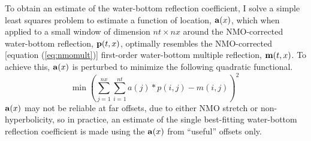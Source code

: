 \par
To obtain an estimate of the water-bottom reflection coefficient, I solve a simple least squares
problem to estimate a function of location, $\bold a(x)$, which when applied to a small window of 
dimension $nt \times nx$
around the NMO-corrected water-bottom reflection, $\bold p(t,x)$, optimally resembles the NMO-corrected 
[equation (\ref{eq:nmomult})] first-order water-bottom multiple reflection, $\bold m(t,x)$.  To achieve 
this, $\bold a(x)$ is perturbed to minimize the following quadratic functional.
\begin{equation}
	\mbox{min} \; \left( \sum_{j=1}^{nx} \sum_{i=1}^{nt} 
		a(j)*p(i,j) - m(i,j) \right)^2 \label{eq:refl-coeff}
\end{equation}
$\bold a(x)$ may not be reliable at far offsets, due to either NMO stretch or non-hyperbolicity,
so in practice, an estimate of the single best-fitting water-bottom reflection coefficient 
is made using the $\bold a(x)$ from ``useful'' offsets only.

